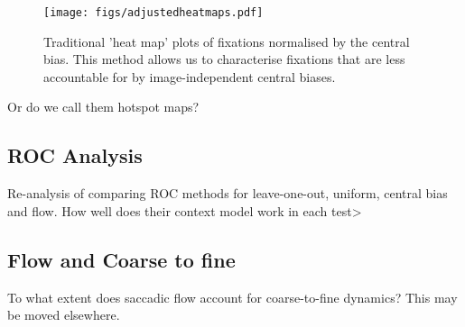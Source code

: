\begin{figure*}
\texttt{[image: figs/adjustedheatmaps.pdf]}
\caption{Traditional 'heat map' plots of fixations normalised by the central bias. This method allows us to characterise fixations that are less accountable for by image-independent central biases.}
\label{fig:adjustedHeatmaps}
\end{figure*}

Or do we call them hotspot maps?

\subsection{ROC Analysis}

Re-analysis of \cite{ehinger2009} comparing ROC methods for leave-one-out, uniform, central bias and flow. How well does their context model work in each test>

\subsection{Flow and Coarse to fine}

To what extent does saccadic flow account for coarse-to-fine dynamics? This may be moved elsewhere. 




